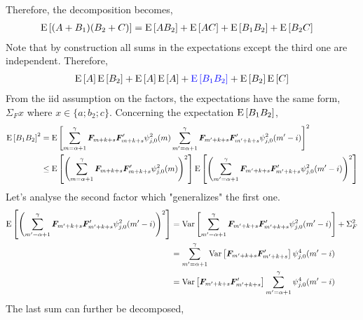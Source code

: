 \documentclass[main_document.tex]{subfiles}
\begin{document}
Therefore, the decomposition becomes, 
\begin{align*}
	\mathrm{E}\left[(A + B_1)(B_2 + C)\right] &= \mathrm{E}\left[AB_2\right] + \mathrm{E}\left[AC\right] + \mathrm{E}\left[B_1 B_2\right] + \mathrm{E}\left[B_2 C\right]
\end{align*}
Note that by construction all sums in the expectations except the third one are independent. Therefore, 
\begin{align*}
	\mathrm{E}\left[A\right] \mathrm{E}\left[B_2\right] + \mathrm{E}\left[A\right]\mathrm{E}\left[A\right] + \textcolor{blue}{\mathrm{E}\left[B_1 B_2\right]} + \mathrm{E}\left[B_2\right] \mathrm{E}\left[C\right]
\end{align*}
From the iid assumption on the factors, the expectations have the same form, $\Sigma_{F} x$ where $x \in \{a;b_2;c \}$.
Concerning the expectation $\mathrm{E}\left[B_1 B_2\right]$, 
\begin{align*}
	\E{B_1 B_2}^{2} &= \E{\sum_{m=\alpha+1}^{\gamma} \factors{m+k+s}\factors{m+k+s}' \squaredWavelet{j}{0}{m} \sum_{m'=\alpha+1}^{\gamma} \factors{m'+k+s}\factors{m'+k+s}' \squaredWavelet{j}{0}{m'-i}}^{2}\\
	& \leq \E{\left( \sum_{m=\alpha+1}^{\gamma} \factors{m+k+s}\factors{m+k+s}' \squaredWavelet{j}{0}{m} \right)^{2}} \E{\left( \sum_{m'=\alpha+1}^{\gamma} \factors{m'+k+s}\factors{m'+k+s}' \squaredWavelet{j}{0}{m'-i} \right)^{2}}
\end{align*}
Let's analyse the second factor which "generalizes" the first one. 
\begin{align*}
	\E{\left( \sum_{m'=\alpha+1}^{\gamma} \factors{m'+k+s}\factors{m'+k+s}' \squaredWavelet{j}{0}{m'-i} \right)^{2}} &= \Var{\sum_{m'=\alpha+1}^{\gamma} \factors{m'+k+s}\factors{m'+k+s}' \squaredWavelet{j}{0}{m'-i}} + \Sigma_{F}^{2} \\
	&= \sum_{m'=\alpha+1}^{\gamma} \Var{\factors{m'+k+s}\factors{m'+k+s}'} \waveletExp{j}{0}{m'-i}{4}\\
	&= \Var{\factors{m'+k+s}\factors{m'+k+s}'} \sum_{m'=\alpha+1}^{\gamma} \waveletExp{j}{0}{m'-i}{4}
\end{align*}
The last sum can further be decomposed, 
\end{document}
